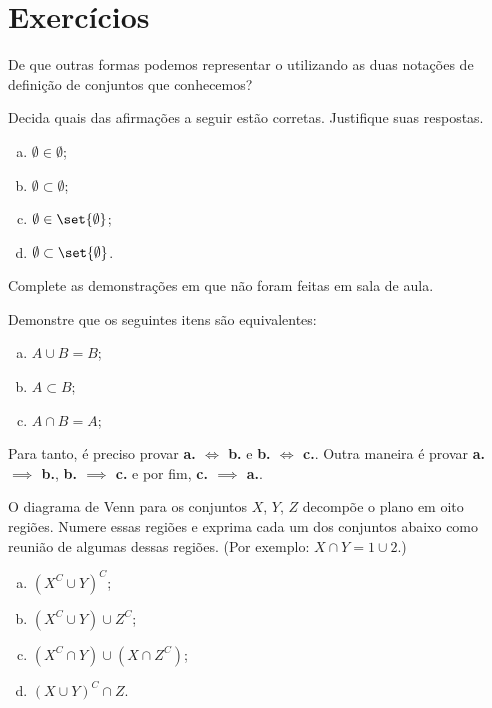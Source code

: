 \section{Exercícios}

\begin{exercise}
\label{exe:vazio-notacao}
	De que outras formas podemos representar o  utilizando as duas notações de definição de conjuntos que conhecemos?
\end{exercise}


\begin{exercise}
\label{exe:vazios-tricky}
	Decida quais das afirmações a seguir estão corretas. Justifique suas respostas.
	\begin{enumerate}[a.]
		\item $\emptyset \in \emptyset$;
		\item $\emptyset \subset \emptyset$;
		\item $\emptyset \in \set{\emptyset}$;
		\item $\emptyset \subset \set{\emptyset}$.
	\end{enumerate}
\end{exercise}

\begin{exercise}
Complete as demonstrações em  que não foram feitas em sala de aula.
\end{exercise}

\begin{exercise}
Demonstre que os seguintes itens são equivalentes:
	\begin{enumerate}[a.]
		\item $A \cup B = B$;
		\item $A \subset B$;
		\item $A \cap B = A$;
	\end{enumerate}
	\begin{hint}
		Para tanto, é preciso provar \textbf{a. $\iff$ b.} e \textbf{b. $\iff$ c.}.
		Outra maneira é provar \textbf{a. $\implies$ b.}, \textbf{b. $\implies$ c.} e por fim, \textbf{c. $\implies$ a.}.
	\end{hint}
\end{exercise}

\begin{exercise}
O diagrama de Venn para os conjuntos $X$, $Y$, $Z$ decompõe o
plano em oito regiões. Numere essas regiões e exprima cada um dos
conjuntos abaixo como reunião de algumas dessas regiões. (Por
exemplo: $X \cap Y = 1 \cup 2$.)
\begin{enumerate}[a.]
  \item $\left(X^C \cup Y \right)^C$;
  \item $\left(X^C \cup Y \right) \cup Z^C$;
  \item $\left(X^C \cap Y \right) \cup \left(X \cap Z^C \right)$;
  \item $\left(X \cup Y \right)^C \cap Z$.
\end{enumerate}
\end{exercise}

